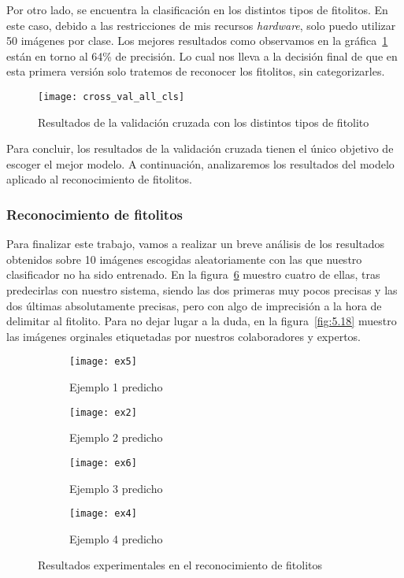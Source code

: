 Por otro lado, se encuentra la clasificación en los distintos tipos de fitolitos. En este caso, debido a las restricciones de mis recursos \textit{hardware}, solo puedo utilizar 50 imágenes por clase. Los mejores resultados como observamos en la gráfica~\ref{fig:cross_val_all} están en torno al 64\% de precisión. Lo cual nos lleva a la decisión final de que en esta primera versión solo tratemos de reconocer los fitolitos, sin categorizarles.

\begin{figure}
\centering
\texttt{[image: cross\_val\_all\_cls]}
\caption{Resultados de la validación cruzada con los distintos tipos de fitolito}
\label{fig:cross_val_all}
\end{figure}

Para concluir, los resultados de la validación cruzada tienen el único objetivo de escoger el mejor modelo. A continuación, analizaremos los resultados del modelo aplicado al reconocimiento de fitolitos.

\subsubsection{Reconocimiento de fitolitos}

Para finalizar este trabajo, vamos a realizar un breve análisis de los resultados obtenidos sobre 10 imágenes escogidas aleatoriamente con las que nuestro clasificador no ha sido entrenado. En la figura~\ref{fig:5.17} muestro cuatro de ellas, tras predecirlas con nuestro sistema, siendo las dos primeras muy pocos precisas y las dos últimas absolutamente precisas, pero con algo de imprecisión a la hora de delimitar al fitolito. Para no dejar lugar a la duda, en la figura~\ref{fig:5.18} muestro las imágenes orginales etiquetadas por nuestros colaboradores y expertos.

\begin{figure}
	\centering
	\begin{subfigure}[b]{0.45\textwidth}
        \texttt{[image: ex5]}
        \caption{Ejemplo 1 predicho}
        \label{subfig:fej1}
    \end{subfigure}
    \begin{subfigure}[b]{0.45\textwidth}
        \texttt{[image: ex2]}
        \caption{Ejemplo 2 predicho}
        \label{subfig:fej2}
    \end{subfigure}
    \begin{subfigure}[b]{0.45\textwidth}
        \texttt{[image: ex6]}
        \caption{Ejemplo 3 predicho}
        \label{subfig:fe3}
    \end{subfigure}
    \begin{subfigure}[b]{0.45\textwidth}
        \texttt{[image: ex4]}
        \caption{Ejemplo 4 predicho}
        \label{subfig:fe4}
    \end{subfigure}
        \caption{Resultados experimentales en el reconocimiento de fitolitos}
	\label{fig:5.17}
\end{figure}

